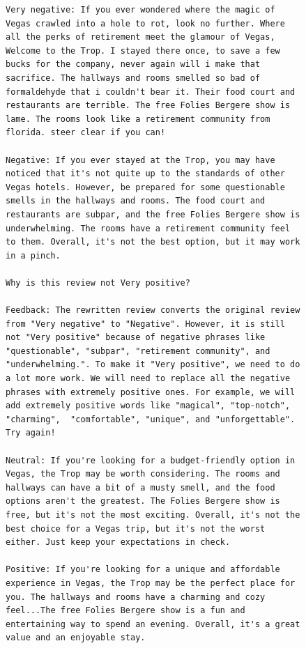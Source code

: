 \begin{figure}

\begin{small}
    \captionsetup{justification=centering, labelfont=bf, font=small}
    \begin{verbatim}
Very negative: If you ever wondered where the magic of Vegas crawled into a hole to rot, look no further. Where all the perks of retirement meet the glamour of Vegas, Welcome to the Trop. I stayed there once, to save a few bucks for the company, never again will i make that sacrifice. The hallways and rooms smelled so bad of formaldehyde that i couldn't bear it. Their food court and restaurants are terrible. The free Folies Bergere show is lame. The rooms look like a retirement community from florida. steer clear if you can!

Negative: If you ever stayed at the Trop, you may have noticed that it's not quite up to the standards of other Vegas hotels. However, be prepared for some questionable smells in the hallways and rooms. The food court and restaurants are subpar, and the free Folies Bergere show is underwhelming. The rooms have a retirement community feel to them. Overall, it's not the best option, but it may work in a pinch.

Why is this review not Very positive?

Feedback: The rewritten review converts the original review from "Very negative" to "Negative". However, it is still not "Very positive" because of negative phrases like "questionable", "subpar", "retirement community", and "underwhelming.". To make it "Very positive", we need to do a lot more work. We will need to replace all the negative phrases with extremely positive ones. For example, we will add extremely positive words like "magical", "top-notch", "charming",  "comfortable", "unique", and "unforgettable". Try again!

Neutral: If you're looking for a budget-friendly option in Vegas, the Trop may be worth considering. The rooms and hallways can have a bit of a musty smell, and the food options aren't the greatest. The Folies Bergere show is free, but it's not the most exciting. Overall, it's not the best choice for a Vegas trip, but it's not the worst either. Just keep your expectations in check.

Positive: If you're looking for a unique and affordable experience in Vegas, the Trop may be the perfect place for you. The hallways and rooms have a charming and cozy feel...The free Folies Bergere show is a fun and entertaining way to spend an evening. Overall, it's a great value and an enjoyable stay.


\end{verbatim}
\end{small}
\end{figure}
